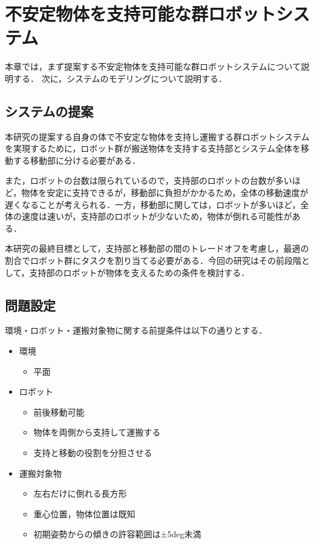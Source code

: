 \chapter{不安定物体を支持可能な群ロボットシステム}
本章では，まず提案する不安定物体を支持可能な群ロボットシステムについて説明する．
次に，システムのモデリングについて説明する．

\section{システムの提案}
本研究の提案する自身の体で不安定な物体を支持し運搬する群ロボットシステムを実現するために，ロボット群が搬送物体を支持する支持部とシステム全体を移動する移動部に分ける必要がある．

また，ロボットの台数は限られているので，支持部のロボットの台数が多いほど，物体を安定に支持できるが，移動部に負担がかかるため，全体の移動速度が遅くなることが考えられる．一方，移動部に関しては，ロボットが多いほど，全体の速度は速いが，支持部のロボットが少ないため，物体が倒れる可能性がある．

本研究の最終目標として，支持部と移動部の間のトレードオフを考慮し，最適の割合でロボット群にタスクを割り当てる必要がある．今回の研究はその前段階として，支持部のロボットが物体を支えるための条件を検討する．
\section{問題設定}
環境・ロボット・運搬対象物に関する前提条件は以下の通りとする．
\begin{itemize}
    \item 環境
    \begin{itemize}
        \item 平面
    \end{itemize}
    \item ロボット
    \begin{itemize}
        \item 前後移動可能
        \item 物体を両側から支持して運搬する
        \item 支持と移動の役割を分担させる
        
    \end{itemize}
    \item 運搬対象物
    \begin{itemize}
        \item 左右だけに倒れる長方形
        \item 重心位置，物体位置は既知
        \item 初期姿勢からの傾きの許容範囲は±5deg未満
    \end{itemize}
    
\end{itemize}
